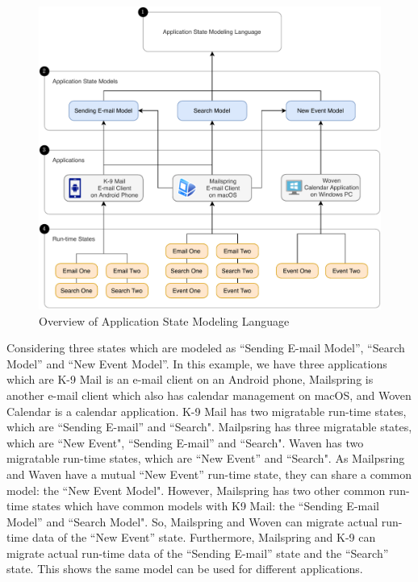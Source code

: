 \FloatBarrier
\begin{figure}
    \includegraphics[scale=0.8]{../figures/asml-overview.pdf}
    \centering
    \caption{Overview of Application State Modeling Language}
    \label{fig:asml-overview}
\end{figure}
\FloatBarrier

Considering three states which are modeled as “Sending E-mail Model”, “Search Model” and “New Event Model”. In this example, we have three applications which are K-9 Mail is an e-mail client on an Android phone, Mailspring is another e-mail client which also has calendar management on macOS, and Woven Calendar is a calendar application. K-9 Mail has two migratable run-time states, which are “Sending E-mail” and “Search". Mailpsring has three migratable states, which are “New Event", “Sending E-mail” and “Search". Waven has two migratable run-time states, which are “New Event” and “Search". As Mailpsring and Waven have a mutual “New Event” run-time state, they can share a common model: the “New Event Model". However, Mailspring has two other common run-time states which have common models with K9 Mail: the “Sending E-mail Model” and “Search Model". So, Mailspring and Woven can migrate actual run-time data of the “New Event” state. Furthermore, Mailspring and K-9 can migrate actual run-time data of the “Sending E-mail” state and the “Search” state. This shows the same model can be used for different applications.

